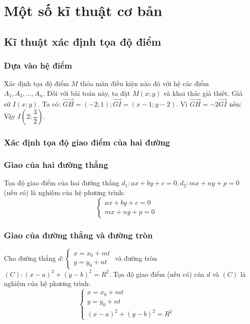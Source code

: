 \section{Một số kĩ thuật cơ bản}
\subsection{Kĩ thuật xác định tọa độ điểm}
\subsubsection{Dựa vào hệ điểm} 
Xác định tọa độ điểm $M$ thỏa mãn điều kiện nào đó với hệ các điểm $A_1,A_2, ..., A_n$. Đối với bài toán này, ta đặt $M(x;y)$ và khai thác giả thiết.
\lgi
Giả sử $I(x;y)$. Ta có: $\overrightarrow{GH}=(-2;1); \overrightarrow{GI}=(x-1;y-2)$. Vì $\overrightarrow{GH}=-2\overrightarrow{GI}$ nên: \\
Vậy $I \left(2; \dfrac{3}{2}\right).$
\subsubsection{Xác định tọa độ giao điểm của hai đường}
\subsubsection*{Giao của hai đường thẳng} 
Tọa độ giao điểm của hai đường thẳng $d_1:ax+by+c=0, d_2: mx+ny+p=0$ (nếu có) là nghiệm của hệ phương trình:
\begin{equation}
\begin{cases} ax+by+c=0 \\ mx+ny+p=0 \end{cases}
\end{equation}
\subsubsection*{Giao của đường thẳng và đường tròn} 
Cho đường thẳng $d: \begin{cases} x= x_0+mt \\y=y_0+nt\end{cases}$ và đường tròn $(C): (x-a)^2+(y-b)^2=R^2$. Tọa độ giao điểm (nếu có) của $d$ và $(C)$ là nghiệm của hệ phương trình:
\begin{equation}
\begin{cases} x= x_0+mt \\y=y_0+nt \\ (x-a)^2+(y-b)^2=R^2 \end{cases}
\end{equation}
